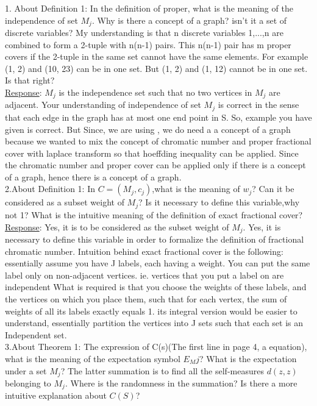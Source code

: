 \documentclass{article}
\begin{document}
1. About Definition 1: In the definition of proper, what is the meaning of the independence of set $M_j$. Why is there a concept of a graph? isn't it a set of discrete variables? My understanding is that n discrete variables {1,...,n} are combined to form a 2-tuple with n(n-1) pairs. This n(n-1) pair has m proper covers if the 2-tuple in the same set cannot have the same elements. For example (1, 2) and (10, 23) can be in one set. But (1, 2) and (1, 12) cannot be in one set. Is that right?\\

\underline{Response}: $M_j$ is the independence set such that no two vertices in $M_j$ are adjacent. Your understanding of independence of set $M_j$ is correct in the sense that each edge in the graph has at most one end point in S. So, example you have given is correct. But Since, we are using \cite{Janson04RSA}, we do need a a concept of a graph because we wanted to mix the concept of chromatic number and proper fractional cover  with laplace transform so that hoeffding inequality can be applied. Since the chromatic number and proper cover can be applied only if there is a concept of a graph, hence there is a concept of a graph.\\


2.About Definition 1: In $C={(M_j,c_j)}$,what is the meaning of $w_j$? Can it be considered as a subset weight of $M_j$? Is it necessary to define this variable,why not 1? What is the intuitive meaning of the definition of exact fractional cover?\\

\underline{Response}: Yes, it is to be considered as the subset weight of $M_j$. Yes, it is necessary to define this variable in order to formalize the definition of fractional chromatic number. Intuition behind exact fractional cover is the following: essentially assume you have J labels, each having a weight.
You can put the same label only on non-adjacent vertices. ie. vertices that you put a label on are independent
What is required is that you choose the weights of these labels, and the vertices on which you place them, such that 
for each vertex, the sum of weights of all its labels exactly equals 1. its integral version would be easier to understand, essentially partition the vertices into J sets such that each set is an Independent set.\\


3.About Theorem 1: The expression of C(s)(The first line in page 4, a equation), what is the meaning of the expectation symbol $E_Mj$? What is the expectation under a set $M_j$? The latter summation is to find all the self-measures $d(z,z)$ belonging to $M_j$. Where is the randomness in the summation? Is there a more intuitive explanation about $C(S)$? \\
\end{document}

